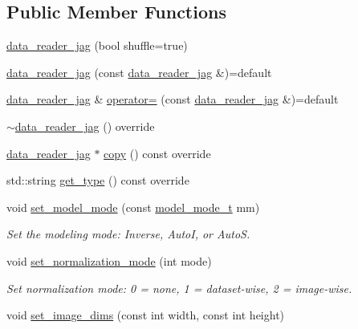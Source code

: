 \subsection*{Public Member Functions}
\begin{DoxyCompactItemize}
\item 
\hyperlink{classlbann_1_1data__reader__jag_a8729a52155d4a4319efb77b1b38bc369}{data\+\_\+reader\+\_\+jag} (bool shuffle=true)
\item 
\hyperlink{classlbann_1_1data__reader__jag_a4cd27646dcb8ccacd3ef370db5859a00}{data\+\_\+reader\+\_\+jag} (const \hyperlink{classlbann_1_1data__reader__jag}{data\+\_\+reader\+\_\+jag} \&)=default
\item 
\hyperlink{classlbann_1_1data__reader__jag}{data\+\_\+reader\+\_\+jag} \& \hyperlink{classlbann_1_1data__reader__jag_adb817a2f42297e4881f128dd88ee9b61}{operator=} (const \hyperlink{classlbann_1_1data__reader__jag}{data\+\_\+reader\+\_\+jag} \&)=default
\item 
\hyperlink{classlbann_1_1data__reader__jag_a1836d2414739490e15b856c911ae84e8}{$\sim$data\+\_\+reader\+\_\+jag} () override
\item 
\hyperlink{classlbann_1_1data__reader__jag}{data\+\_\+reader\+\_\+jag} $\ast$ \hyperlink{classlbann_1_1data__reader__jag_aa4c2d2536e32af08762cf159981631af}{copy} () const override
\item 
std\+::string \hyperlink{classlbann_1_1data__reader__jag_ae3f45a65894cb60343676d75a8b7f99c}{get\+\_\+type} () const override
\item 
void \hyperlink{classlbann_1_1data__reader__jag_a143e41b76858ffb6606bafb376c09418}{set\+\_\+model\+\_\+mode} (const \hyperlink{classlbann_1_1data__reader__jag_a114c369c8604df385cf7a3ec20c9739b}{model\+\_\+mode\+\_\+t} mm)
\begin{DoxyCompactList}\small\item\em Set the modeling mode\+: Inverse, AutoI, or AutoS. \end{DoxyCompactList}\item 
void \hyperlink{classlbann_1_1data__reader__jag_a260e95eafd4e4b334cffe189db344d05}{set\+\_\+normalization\+\_\+mode} (int mode)
\begin{DoxyCompactList}\small\item\em Set normalization mode\+: 0 = none, 1 = dataset-\/wise, 2 = image-\/wise. \end{DoxyCompactList}\item 
void \hyperlink{classlbann_1_1data__reader__jag_a7b76ea4a64b8072728eb1b41d5a62f47}{set\+\_\+image\+\_\+dims} (const int width, const int height)

\end{DoxyCompactItemize}
